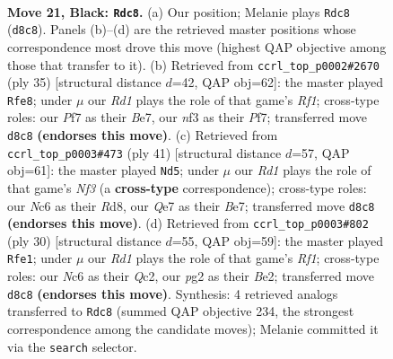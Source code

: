 \documentclass[11pt]{article}
\begin{document}
\clearpage

\begin{figure}[p]\centering
\begin{subfigure}{0.46\textwidth}\centering
\resizebox{\linewidth}{!}{%
\newchessgame
\chessboard[
  setfen={1r1r2k1/1p1bqppp/2n1p3/2Pp3P/p2P4/P1P2N2/RQ2BPP1/2R3K1 b - - 0 21},
  showmover=false,
  pgfstyle=straightmove, color=movearrow, markmove={d8-c8}
]}
\caption{}
\end{subfigure}\hfill
\begin{subfigure}{0.46\textwidth}\centering
\resizebox{\linewidth}{!}{%
\newchessgame
\chessboard[
  setfen={2r2rk1/1pq1bpp1/p2ppn2/7p/2PNP2P/4BP2/PP1Q2P1/1KR2R2 b - - 2 18},
  showmover=false,
  pgfstyle=straightmove, color=movearrow, markmove={f8-e8}
]}
\caption{}
\end{subfigure}
\\[4pt]
\begin{subfigure}{0.46\textwidth}\centering
\resizebox{\linewidth}{!}{%
\newchessgame
\chessboard[
  setfen={r2r2k1/4bppp/q1p1pn2/1pP5/p2P1B1P/3R1N2/PP2QPP1/2R3K1 b - - 2 21},
  showmover=false,
  pgfstyle=straightmove, color=movearrow, markmove={f6-d5}
]}
\caption{}
\end{subfigure}\hfill
\begin{subfigure}{0.46\textwidth}\centering
\resizebox{\linewidth}{!}{%
\newchessgame
\chessboard[
  setfen={r1br2k1/p1p1qppp/1p3n2/3p4/3P4/2N1P2P/PPQ1BPP1/R4RK1 w - - 3 16},
  showmover=false,
  pgfstyle=straightmove, color=movearrow, markmove={f1-e1}
]}
\caption{}
\end{subfigure}
\caption{\textbf{Move 21, Black: \texttt{Rdc8}.} (a) Our position; Melanie plays \texttt{Rdc8} (\texttt{d8c8}). Panels (b)--(d) are the retrieved master positions whose correspondence most drove this move (highest QAP objective among those that transfer to it). (b) Retrieved from \texttt{ccrl\_top\_p0002\#2670} (ply 35) [structural distance $d$=42, QAP obj=62]: the master played \texttt{Rfe8}; under $\mu$ our \emph{Rd1} plays the role of that game's \emph{Rf1}; cross-type roles: our \emph{P}f7 as their \emph{B}e7, our \emph{n}f3 as their \emph{P}f7; transferred move \texttt{d8c8} \textbf{(endorses this move)}. (c) Retrieved from \texttt{ccrl\_top\_p0003\#473} (ply 41) [structural distance $d$=57, QAP obj=61]: the master played \texttt{Nd5}; under $\mu$ our \emph{Rd1} plays the role of that game's \emph{Nf3} (a \textbf{cross-type} correspondence); cross-type roles: our \emph{N}c6 as their \emph{R}d8, our \emph{Q}e7 as their \emph{B}e7; transferred move \texttt{d8c8} \textbf{(endorses this move)}. (d) Retrieved from \texttt{ccrl\_top\_p0003\#802} (ply 30) [structural distance $d$=55, QAP obj=59]: the master played \texttt{Rfe1}; under $\mu$ our \emph{Rd1} plays the role of that game's \emph{Rf1}; cross-type roles: our \emph{N}c6 as their \emph{Q}c2, our \emph{p}g2 as their \emph{B}e2; transferred move \texttt{d8c8} \textbf{(endorses this move)}. Synthesis: 4 retrieved analogs transferred to \texttt{Rdc8} (summed QAP objective 234, the strongest correspondence among the candidate moves); Melanie committed it via the \texttt{search} selector.}
\label{fig:thought-m41}
\end{figure}
\end{document}
